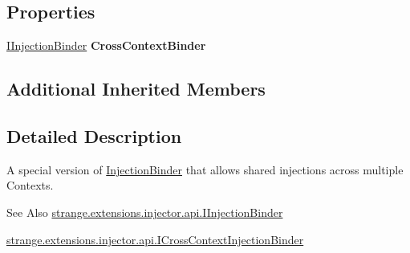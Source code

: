 \subsection*{Properties}
\begin{DoxyCompactItemize}
\item 
\hypertarget{classstrange_1_1extensions_1_1injector_1_1impl_1_1_cross_context_injection_binder_acb7ba99973c93cb3435227803434c6ca}{\hyperlink{interfacestrange_1_1extensions_1_1injector_1_1api_1_1_i_injection_binder}{I\-Injection\-Binder} {\bfseries Cross\-Context\-Binder}}\label{classstrange_1_1extensions_1_1injector_1_1impl_1_1_cross_context_injection_binder_acb7ba99973c93cb3435227803434c6ca}

\end{DoxyCompactItemize}
\subsection*{Additional Inherited Members}


\subsection{Detailed Description}
A special version of \hyperlink{classstrange_1_1extensions_1_1injector_1_1impl_1_1_injection_binder}{Injection\-Binder} that allows shared injections across multiple Contexts. 

\begin{DoxySeeAlso}{See Also}
\hyperlink{interfacestrange_1_1extensions_1_1injector_1_1api_1_1_i_injection_binder}{strange.\-extensions.\-injector.\-api.\-I\-Injection\-Binder} 

\hyperlink{interfacestrange_1_1extensions_1_1injector_1_1api_1_1_i_cross_context_injection_binder}{strange.\-extensions.\-injector.\-api.\-I\-Cross\-Context\-Injection\-Binder} 
\end{DoxySeeAlso}


